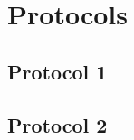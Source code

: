 \documentclass[11pt]{article}
\begin{document}
	\section{Protocols}
	\subsection{Protocol 1}
	
	\subsection{Protocol 2}
	
\end{document}
